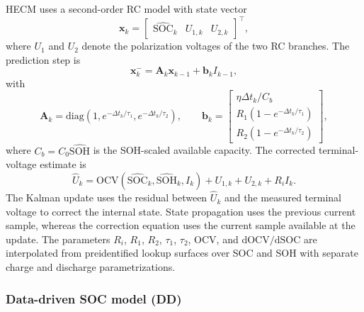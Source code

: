 HECM uses a second-order RC model with state vector
\begin{equation}
    \mathbf{x}_k=
    \begin{bmatrix}
        \widehat{\mathrm{SOC}}_k & U_{1,k} & U_{2,k}
    \end{bmatrix}^{\top},
    \label{eq:robustness_hecm_state}
\end{equation}
where $U_1$ and $U_2$ denote the polarization voltages of the two RC branches. The prediction step is
\begin{equation}
    \mathbf{x}_{k}^{-}=\mathbf{A}_k\mathbf{x}_{k-1}+\mathbf{b}_kI_{k-1},
    \label{eq:robustness_hecm_prediction}
\end{equation}
with
\begin{equation}
    \mathbf{A}_k=\mathrm{diag}\!\left(1,e^{-\Delta t_k/\tau_1},e^{-\Delta t_k/\tau_2}\right),
    \qquad
    \mathbf{b}_k=
    \begin{bmatrix}
        \eta\Delta t_k/C_b\\
        R_1\!\left(1-e^{-\Delta t_k/\tau_1}\right)\\
        R_2\!\left(1-e^{-\Delta t_k/\tau_2}\right)
    \end{bmatrix},
    \label{eq:robustness_hecm_ab}
\end{equation}
where $C_b=C_0\widehat{\mathrm{SOH}}$ is the SOH-scaled available capacity. The corrected terminal-voltage estimate is
\begin{equation}
    \widehat{U}_k=
    \mathrm{OCV}\!\left(\widehat{\mathrm{SOC}}_k,\widehat{\mathrm{SOH}}_k,I_k\right)
    +U_{1,k}+U_{2,k}+R_iI_k.
    \label{eq:robustness_hecm_voltage}
\end{equation}
The Kalman update uses the residual between $\widehat{U}_k$ and the measured terminal voltage to correct the internal state. State propagation uses the previous current sample, whereas the correction equation uses the current sample available at the update. The parameters $R_i$, $R_1$, $R_2$, $\tau_1$, $\tau_2$, OCV, and $\mathrm{dOCV}/\mathrm{dSOC}$ are interpolated from preidentified lookup surfaces over SOC and SOH with separate charge and discharge parametrizations.

\subsubsection{Data-driven SOC model (DD)}

